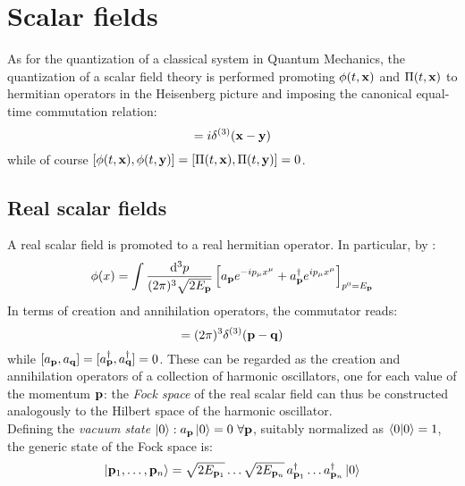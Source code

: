 
\section{Scalar fields}

As for the quantization of a classical system in Quantum Mechanics, the quantization of a scalar field theory is performed promoting $ \phi(t,\mathbf{x}) $ and $ \Pi(t,\mathbf{x}) $ to hermitian operators in the Heisenberg picture and imposing the canonical equal-time commutation relation:
\begin{equation}
  [\phi(t,\ve{x}) , \Pi(t,\ve{y})] = i \delta^{(3)}(\ve{x} - \ve{y})
  \label{eq:scalar-quant-comm}
\end{equation}
while of course $ [\phi(t,\mathbf{x}) , \phi(t,\mathbf{y})] = [\Pi(t,\mathbf{x}) , \Pi(t,\mathbf{y})] = 0 $.

\subsection{Real scalar fields}

A real scalar field is promoted to a real hermitian operator. In particular, by :
\begin{equation}
  \phi(x) = \int \frac{\mathrm{d}^3p}{(2\pi)^3 \sqrt{2E_{\mathbf{p}}}} \left[ a_{\mathbf{p}} e^{-i p_\mu x^\mu} + a_{\mathbf{p}}^\dagger e^{i p_\mu x^\mu} \right]_{p^0 = E_{\mathbf{p}}}
  \label{eq:scalar-quant-exp}
\end{equation}
In terms of creation and annihilation operators, the commutator  reads:
\begin{equation}
  [a_\ve{p} , a_\ve{p}^\dagger] = (2\pi)^3 \delta^{(3)}(\ve{p} - \ve{q})
  \label{eq:scalar-quant-op-comm}
\end{equation}
while $ [a_{\mathbf{p}} , a_{\mathbf{q}}] = [a_{\mathbf{p}}^\dagger , a_{\mathbf{q}}^\dagger] = 0 $. These can be regarded as the creation and annihilation operators of a collection of harmonic oscillators, one for each value of the momentum $ \mathbf{p} $: the \textit{Fock space} of the real scalar field can thus be constructed analogously to the Hilbert space of the harmonic oscillator.\\
Defining the \textit{vacuum state} $ \ket{0} : a_{\mathbf{p}} \ket{0} = 0 \,\,\forall \mathbf{p} $, suitably normalized as $ \braket{0 | 0} = 1 $, the generic state of the Fock space is:
\begin{equation}
  \ket{\mathbf{p}_1 , \dots , \mathbf{p}_n} = \sqrt{2E_{\mathbf{p}_1}} \dots \sqrt{2E_{\mathbf{p}_n}}\, a_{\mathbf{p}_1}^\dagger \dots a_{\mathbf{p}_n}^\dagger \ket{0}
\end{equation}

